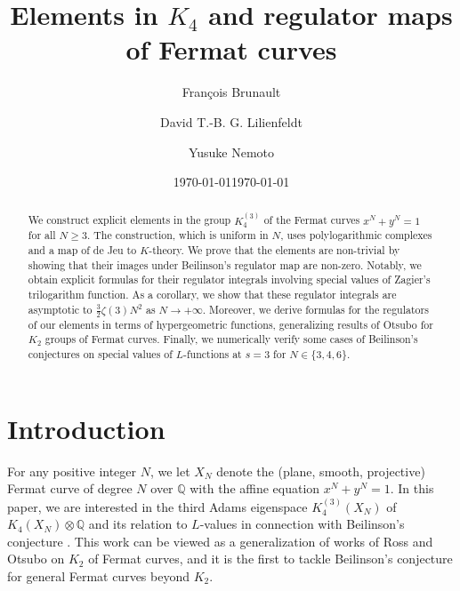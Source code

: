 \documentclass[11pt,a4,leqno]{amsart}
\date{\today}
\theoremstyle{my theoremstyle}
\theoremstyle{dfn}
\theoremstyle{remark}
\renewcommand{\1}{\mathbbm{1}}
\newcommand{\Q}{\mathbb{Q}}
\numberwithin{equation}{section}
\begin{document}
 
\title{Elements in $K_4$ and regulator maps of Fermat curves}
\author{Fran\c{c}ois Brunault}
\author[David Lilienfeldt]{David T.-B. G. Lilienfeldt}
\author{Yusuke Nemoto}
\date{\today}
\address{FB: Unité de mathématiques pures et appliquées (UMPA), ENS de Lyon, 46 allée d'Italie, 69007 Lyon, France.}
\address{DL: Centre de Mathématiques Laurent Schwartz (CMLS), CNRS, École polytechnique, Institut Polytechnique de Paris, Palaiseau, France.} 
\address{YN: Graduate School of Science, Chiba University, 
Yayoicho 1-33, Inage, Chiba, 263-8522, Japan.}

\begin{abstract}
    We construct explicit elements in the group $K_4^{(3)}$ of the Fermat curves $x^N+y^N=1$ for all $N\geq 3$. The construction, which is uniform in $N$, uses polylogarithmic complexes and a map of de Jeu to $K$-theory. We prove that the elements are non-trivial by showing that their images under Beilinson's regulator map are non-zero. Notably, we obtain explicit formulas for their regulator integrals involving special values of Zagier's trilogarithm function. As a corollary, we show that these regulator integrals are asymptotic to $\frac{3}{2}\zeta(3)N^2$ as $N\to +\infty$. Moreover, we derive formulas for the regulators of our elements in terms of hypergeometric functions, generalizing results of Otsubo for $K_2$ groups of Fermat curves. Finally, we numerically verify some cases of Beilinson's conjectures on special values of $L$-functions at $s=3$ for $N\in \{ 3,4,6 \}$. 
\end{abstract}

\maketitle


\tableofcontents


\section{Introduction}

For any positive integer $N$, we let $X_N$ denote the (plane, smooth, projective) Fermat curve of degree $N$ over $\Q$ with the affine equation
$x^N+ y^N=1.$ In this paper, we are interested in the third Adams eigenspace $K_4^{(3)}(X_N)$ of $K_4(X_N)\otimes \Q$ 
and its relation to $L$-values in connection with Beilinson's conjecture \cite{Bei80}. 
This work can be viewed as a generalization of works of Ross \cite{Ross94} and Otsubo \cite{Ots11} on $K_2$ of Fermat curves, and it is the first to tackle Beilinson's conjecture for general Fermat curves beyond $K_2$. 
\end{document}
